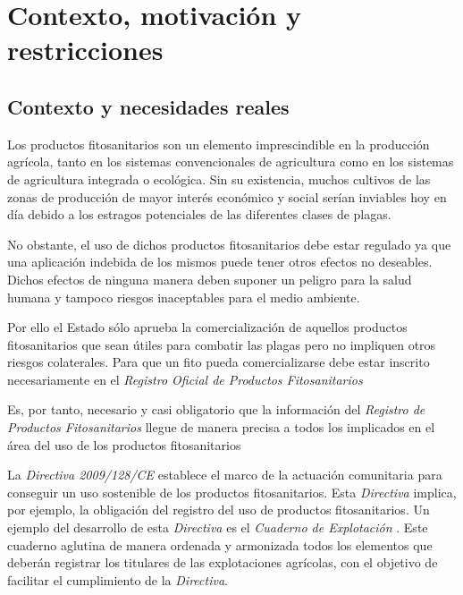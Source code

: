 \chapter{Contexto, motivación y restricciones} \label{phytoscheme}
\section{Contexto y necesidades reales} \label{phytoscheme.contexto}
Los productos fitosanitarios son un elemento imprescindible en la producción agrícola, tanto en los sistemas convencionales de agricultura como en los sistemas de agricultura integrada o ecológica. Sin su existencia, muchos cultivos de las zonas de producción de mayor interés económico y social serían inviables hoy en día debido a los estragos potenciales de las diferentes clases de plagas.\par
No obstante, el uso de dichos productos fitosanitarios debe estar regulado ya que una aplicación indebida de los mismos puede tener otros efectos no deseables. Dichos efectos de ninguna manera deben suponer un peligro para la salud humana y tampoco riesgos inaceptables para el medio ambiente. \par
Por ello el Estado sólo aprueba la comercialización de aquellos productos fitosanitarios que sean útiles para combatir las plagas pero no impliquen otros riesgos colaterales. Para que un \gls{fito} pueda comercializarse debe estar inscrito necesariamente en el \textit{Registro Oficial de Productos Fitosanitarios} \cite{mapama}
\par
Es, por tanto, necesario y casi obligatorio que la información del \textit{Registro de Productos Fitosanitarios} llegue de manera precisa a todos los implicados en el área del uso de los productos fitosanitarios\par
La \textit{Directiva 2009/128/CE} \cite{directiva128} establece el marco de la actuación comunitaria para conseguir un uso sostenible de los productos fitosanitarios. Esta \textit{Directiva} implica, por ejemplo, la obligación del registro del uso de productos fitosanitarios. Un ejemplo del desarrollo de esta \textit{Directiva} es el \textit{Cuaderno de Explotación} \cite{cuadernoexplotacion}. Este cuaderno aglutina de manera ordenada y armonizada todos los elementos que deberán registrar los titulares de las explotaciones agrícolas, con el objetivo de facilitar el cumplimiento de la \textit{Directiva}.\par
